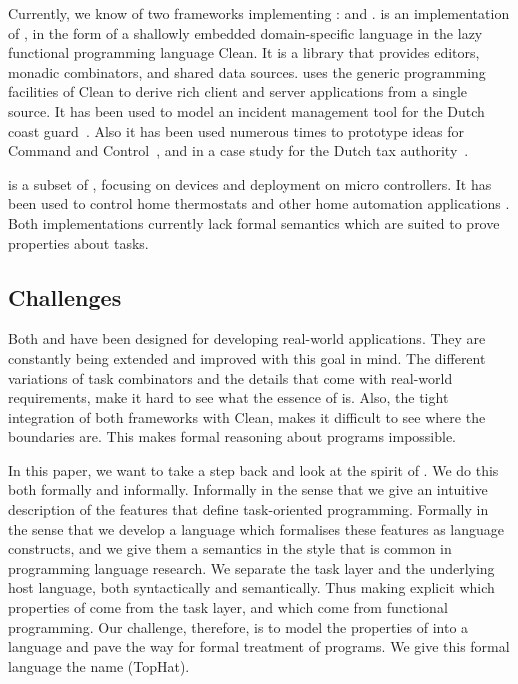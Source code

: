 Currently, we know of two frameworks implementing \TOP: \ITASKS and \MTASKS.
%
\ITASKS is an implementation of \TOP, in the form of a shallowly embedded domain-specific language in the lazy functional programming language Clean.
It is a library that provides editors, monadic combinators, and shared data sources.
\ITASKS uses the generic programming facilities of Clean to derive rich client and server applications from a single source.
It has been used to model an incident management tool for the Dutch coast guard~\cite{conf/iscram/LijnseJP12}.
Also it has been used numerous times to prototype ideas for Command and Control~\cite{theses/nlda/Kool17, theses/radboud/Stutterheim17}, and in a case study for the Dutch tax authority~\cite{conf/sfp/StutterheimAP17}.

\MTASKS is a subset of \ITASKS,
focusing on \IOT devices and deployment on micro controllers.
It has been used to control home thermostats and other home automation applications \cite{koopman2018task}.
%
Both implementations currently lack formal semantics which are suited to prove properties about tasks.



\subsection{Challenges}

Both \ITASKS and \MTASKS have been designed for developing real-world applications.
They are constantly being extended and improved with this goal in mind.
The different variations of task combinators and the details that come with real-world requirements,
make it hard to see what the essence of \TOP is.
Also, the tight integration of both frameworks with Clean, makes it difficult to see where the boundaries are.
This makes formal reasoning about \TOP programs impossible.

In this paper, we want to take a step back and look at the spirit of \TOP.
We do this both formally and informally.
Informally in the sense that we give an intuitive description of the features that define task-oriented programming.
Formally in the sense that we develop a language which formalises these features as language constructs,
and we give them a semantics in the style that is common in programming language research.
We separate the task layer and the underlying host language, both syntactically and semantically.
Thus making explicit which properties of \TOP come from the task layer, and which come from functional programming.
Our challenge, therefore, is to model the properties of \TOP into a language
and pave the way for formal treatment of \TOP programs.
We give this formal language the name \TOPHAT (TopHat).



